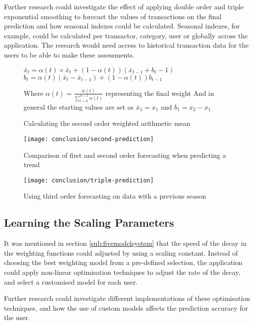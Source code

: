 Further research could investigate the effect of applying double order and triple exponential smoothing to forecast the values of transactions on the final prediction and how seasonal indexes could be calculated. Seasonal indexes, for example, could be calculated per transactor, category, user or globally across the application. The research would need access to historical transaction data for the users to be able to make these assessments.

\begin{figure}
$\bar{x}_t = \alpha(t) \times \bar{x}_t + (1 - \alpha(t))(\bar{x}_{t-1} + b_t-1)$
$b_t = \alpha(t)(\bar{x}_t - \bar{x}_{t-1}) + (1 - \alpha(t))b_{t-1}$

Where $\alpha(t) = \frac{w(t)}{\sum_{t=0}^{n-1}{w(t)}}$ representing the final weight
And in general the starting values are set as $\bar{x}_1 = x_1$ and $b_1 = x_2 - x_1$

\caption{Calculating the second order weighted arithmetic mean}
\label{fig:second-order-math}
\end{figure}

\begin{figure}
\centering
\texttt{[image: conclusion/second-prediction]}
\caption{Comparison of first and second order forecasting when predicting a trend}
\label{fig:prediction-second}
\end{figure}

\begin{figure}
\centering
\texttt{[image: conclusion/triple-prediction]}
\caption{Using third order forecasting on data with a previous season}
\label{fig:prediction-third}
\end{figure}

\subsection{Learning the Scaling Parameters}
\label{section:learningscalingparameter}
It was mentioned in section \ref{sub:fivemodelsystem} that the speed of the decay in the weighting functions could adjusted by using a scaling constant. Instead of choosing the best weighting model from a pre-defined selection, the application could apply non-linear optimisation techniques to adjust the rate of the decay, and select a customised model for each user. 

Further research could investigate different implementations of these optimisation techniques, and how the use of custom models affects the prediction accuracy for the user.

